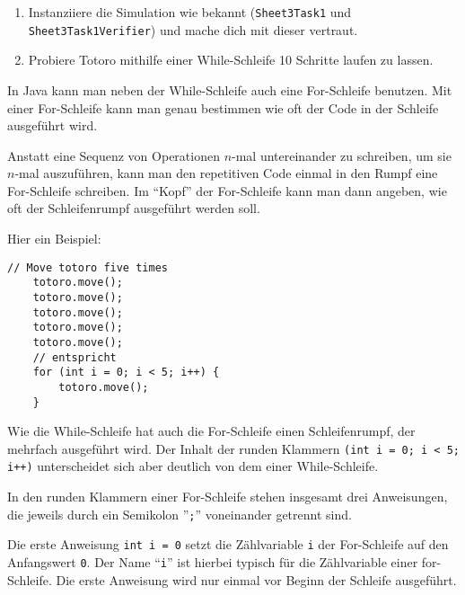 
\begin{enumerate}
	\item Instanziiere die Simulation wie bekannt (\lstinline{Sheet3Task1} und \lstinline{Sheet3Task1Verifier}) und mache dich mit dieser vertraut.
	\item Probiere Totoro mithilfe einer While-Schleife 10 Schritte laufen zu lassen.\\

\end{enumerate}


\begin{Infobox}
	In Java kann man neben der While-Schleife auch eine For-Schleife benutzen.
	Mit einer For-Schleife kann man genau bestimmen wie oft der Code in der Schleife ausgeführt wird.\newline

	Anstatt eine Sequenz von Operationen $n$-mal untereinander zu schreiben, um sie $n$-mal auszuführen, kann man den repetitiven Code einmal in den Rumpf eine For-Schleife schreiben.
	Im \enquote{Kopf} der For-Schleife kann man dann angeben, wie oft der Schleifenrumpf ausgeführt werden soll.\newline

	Hier ein Beispiel:

	\begin{lstlisting}[numbers=none]
	// Move totoro five times
	totoro.move();
	totoro.move();
	totoro.move();
	totoro.move();
	totoro.move();
	// entspricht
	for (int i = 0; i < 5; i++) {
		totoro.move();
	}
	\end{lstlisting}

	Wie die While-Schleife hat auch die For-Schleife einen Schleifenrumpf, der mehrfach ausgeführt wird.
Der Inhalt der runden Klammern \lstinline{(int i = 0; i < 5; i++)} unterscheidet sich aber deutlich von dem einer While-Schleife.\newline

In den runden Klammern einer For-Schleife stehen insgesamt drei Anweisungen, die jeweils durch ein Semikolon ''\lstinline{;}'' voneinander getrennt sind.

Die erste Anweisung \lstinline{int i = 0} setzt die Zählvariable \lstinline{i} der For-Schleife auf den Anfangswert \lstinline{0}.
Der Name \enquote{\lstinline{i}} ist hierbei typisch für die Zählvariable einer for-Schleife.
Die erste Anweisung wird nur einmal vor Beginn der Schleife ausgeführt.\newline


\end{Infobox}
